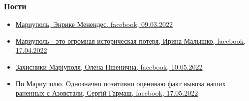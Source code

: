  
 
 
 
 

\subsubsection{Пости}
\label{sec:topics.vojna.mariupol.posts}



\begin{itemize} %

\item \hyperlink{09_03_2022.fb.menendes_enrike.1.mariupol}{%
Мариуполь, Энрике Менендес, facebook, 09.03.2022
}

\item \hyperlink{17_04_2022.fb.malyshko_irina.1.mariupol_muzej}{%
Мариуполь - это огромная историческая потеря, Ирина Малышко, facebook, 17.04.2022%
}

\item \hyperlink{10_05_2022.fb.pshenychna_olena.kiev.1.zahysnyky_mariupolja}{%
Захисники Маріуполя, Олена Пшенична, facebook, 10.05.2022%
}

\item \hyperlink{17_05_2022.fb.garmash_sergej.1.po_mariupolju}{%
По Мариуполю. Однозначно позитивно оцениваю факт вывоза наших раненных с Азовстали, Сергій Гармаш, facebook, %
17.05.2022%
}

\end{itemize} %


